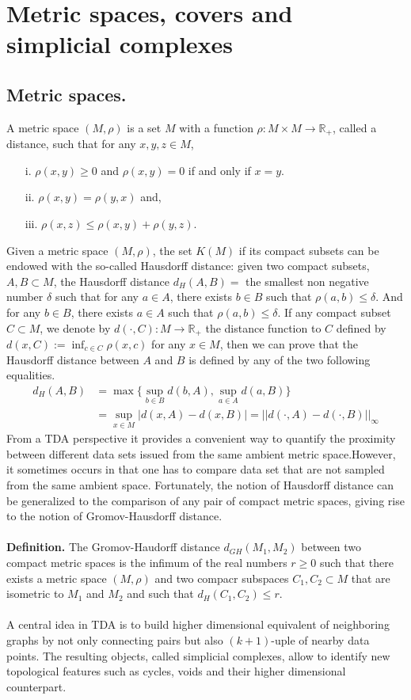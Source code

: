 \section{Metric spaces, covers and simplicial complexes}
\subsection{Metric spaces.} A metric space $(M, \rho)$ is a set $M$ with a function $\rho: M \times M \rightarrow \mathbb{R}_+$, called a distance, such that for any $x,y,z \in M$,
\begin{enumerate}
    \item[i.] $\rho(x,y) \geq 0$ and $\rho(x,y)=0$ if and only if $x=y$.
    \item[ii.]$\rho(x,y) = \rho(y,x)$ and,
    \item[iii.]$\rho(x,z) \leq \rho(x,y)+\rho(y,z)$.
\end{enumerate}
Given a metric space $(M, \rho)$, the set $K(M)$ if its compact subsets can be endowed with the so-called Hausdorff distance: given two compact subsets, $A, B \subset M$, the Hausdorff distance $d_H(A,B) = $ the smallest non negative number $\delta$ such that for any $a\in A$, there exists $b\in B$ such that $\rho(a,b)\leq \delta$. And for any $b\in B$, there exists $a\in A$ such that $\rho(a,b)\leq \delta$. If any compact subset $C \subset M$, we denote by $d(\cdot, C): M \rightarrow \mathbb{R}_+$ the distance function to $C$ defined by $d(x,C):= \inf_{c\in C}\rho(x,c)$ for any $x\in M$, then we can prove that the Hausdorff distance between $A$ and $B$ is defined by any of the two following equalities.
\begin{align*}
    d_H(A,B) &= \max\{\sup_{b\in B}d(b,A), \sup_{a\in A}d(a,B)\}\\
    &= \sup_{x\in M}|d(x,A)-d(x,B)| = ||d(\cdot, A) - d(\cdot, B)||_\infty
\end{align*}
From a TDA perspective it provides a convenient way to quantify the proximity between different data sets issued from the same ambient metric space.However, it sometimes occurs in that one has to compare data set that are not sampled from the same ambient space. Fortunately, the notion of Hausdorff distance can be generalized to the comparison of any pair of compact metric spaces, giving rise to the notion of Gromov-Hausdorff distance. \\\\
\textbf{Definition. }The Gromov-Haudorff distance $d_{GH}(M_1, M_2)$ between two compact metric spaces is the infimum of the real numbers $r \geq 0$ such that there exists a metric space $(M, \rho)$ and two compacr subspaces $C_1, C_2 \subset M$ that are isometric to $M_1$ and $M_2$ and such that $d_H(C_1, C_2) \leq r$. \\\\
A central idea in TDA is to build higher dimensional equivalent of neighboring graphs by not only connecting pairs but also $(k + 1)$-uple of nearby data points. The resulting objects, called simplicial complexes, allow to identify new topological features such as cycles, voids and their higher dimensional counterpart.
